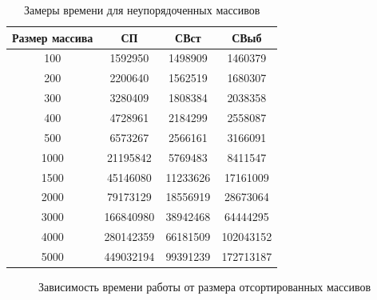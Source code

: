 \documentclass[12pt]{report}
\begin{document}
\newpage

\begin{table}[h]
	\begin{center}
		\caption{\label{time3} Замеры времени для неупорядоченных массивов}
		\begin{tabular}{|c c c c|} 
 			\hline
			Размер массива & СП & СВст & СВыб \\ [0.5ex] 
 			\hline\hline
 			100 & 1592950 & 1498909 & 1460379\\
 			\hline
 			200 & 2200640 & 1562519 & 1680307\\
 			\hline
			300 & 3280409 & 1808384 & 2038358\\
			\hline
			400 & 4728961 & 2184299 & 2558087\\
			\hline
			500 & 6573267 & 2566161 & 3166091\\
			\hline
			1000 & 21195842 & 5769483 & 8411547\\
			\hline
			1500 & 45146080 & 11233626 & 17161009\\
			\hline
			2000 & 79173129 & 18556919 & 28673064\\
			\hline
			3000 & 166840980 & 38942468 & 64444295\\
			\hline
			4000 & 280142359 & 66181509 & 102043152\\
			\hline
			5000 & 449032194 & 99391239 	& 172713187\\
			\hline
			\end{tabular}
	\end{center}
\end{table}

\begin{figure}[h]
\begin{center}
	\captionsetup{justification=centering}
	\caption{Зависимость времени работы от размера отсортированных массивов}
	\label{timeRes1}
	\end{center}
\end{figure}
\end{document}
